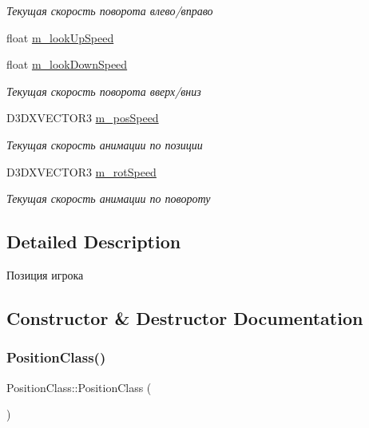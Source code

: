\begin{DoxyCompactItemize}
\begin{DoxyCompactList}\small\item\em Текущая скорость поворота влево/вправо \end{DoxyCompactList}\item 
float \hyperlink{class_position_class_aa0be8eccceabf9725d2fd43b7730cef8}{m\+\_\+look\+Up\+Speed}
\item 
float \hyperlink{class_position_class_acb6764e0ad4b5a325ba37f0d5a827380}{m\+\_\+look\+Down\+Speed}
\begin{DoxyCompactList}\small\item\em Текущая скорость поворота вверх/вниз \end{DoxyCompactList}\item 
D3\+D\+X\+V\+E\+C\+T\+O\+R3 \hyperlink{class_position_class_a73a75e3e007f83baf562ff7b9a0eb501}{m\+\_\+pos\+Speed}
\begin{DoxyCompactList}\small\item\em Текущая скорость анимации по позиции \end{DoxyCompactList}\item 
D3\+D\+X\+V\+E\+C\+T\+O\+R3 \hyperlink{class_position_class_aeadcd89f8d93f83d3d215f06d41bd179}{m\+\_\+rot\+Speed}
\begin{DoxyCompactList}\small\item\em Текущая скорость анимации по повороту \end{DoxyCompactList}\end{DoxyCompactItemize}


\subsection{Detailed Description}
Позиция игрока 

\subsection{Constructor \& Destructor Documentation}
\mbox{\label{class_position_class_a830ac0c2129c3eed555e5d8dfa8615f0}} 
\subsubsection{\texorpdfstring{Position\+Class()}{PositionClass()}\hspace{0.1cm}{\footnotesize\ttfamily [1/2]}}
{\footnotesize\ttfamily Position\+Class\+::\+Position\+Class (\begin{DoxyParamCaption}{ }\end{DoxyParamCaption})}

